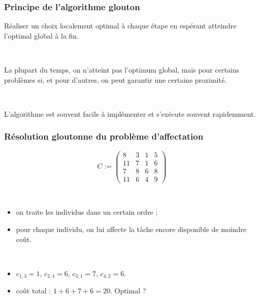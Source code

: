 \documentclass{beamer}
\begin{document}
\begin{frame}
  \frametitle{Principe de l'algorithme glouton}

  Réaliser un choix localement optimal à chaque étape en espérant atteindre
  l'optimal global à la fin.

  ~
  
  La plupart du temps, on n'atteint pas l'optimum global, mais pour certains
  problèmes si, et pour d'autres, on peut garantir une certaine proximité. 

  

  ~
  
  L'algorithme est souvent facile à implémenter et s'exécute souvent rapidemment. 
  
\end{frame}

\begin{frame}
  \frametitle{Résolution gloutonne du problème d'affectation}

  \[
  C := \left(
  \begin{array}{cccc}
    8 & 3 & 1 & 5 \\
    11 & 7 & 1 & 6 \\
    7 & 8 & 6 & 8 \\
    11 & 6 & 4 & 9 
  \end{array}
  \right)
  \]

  ~
  
  \begin{itemize}
  \item on traite les individus dans un certain ordre ; 
  \item pour chaque individu, on lui affecte la tâche encore disponible de moindre coût.
  \end{itemize}

  ~
  
  \begin{itemize}
  \item $c_{1,3} = 1$, $c_{2,4} = 6$, $c_{3,1} = 7$, $c_{4,2} = 6$.
  \item coût total : $1 + 6 + 7 + 6 = 20$. Optimal ?
  \end{itemize}
  
\end{frame}
\end{document}
